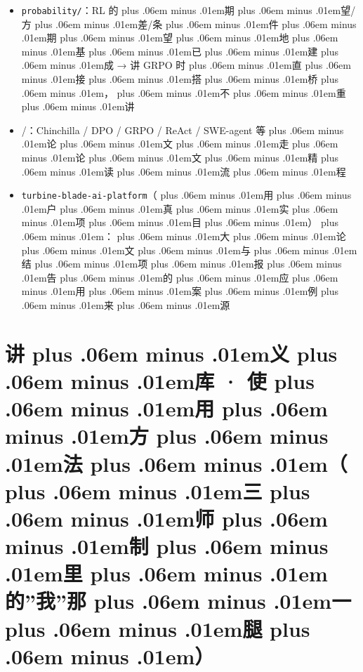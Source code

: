 \documentclass[
]{article}
\newcommand{\passthrough}[1]{#1}
\providecommand{\tightlist}{%
  \setlength{\itemsep}{0pt}\setlength{\parskip}{0pt}}
\def\zh#1{{\zhfont #1}}
\def\sym#1{{\symfont #1}}
\def\codezh#1{{\zhmonofont #1}}
\def\zhglue{\hskip0pt plus .06em minus .01em}
\begin{document}
\begin{itemize}
\tightlist
\item
  \passthrough{\lstinline!probability/!}\zh{：}RL \zh{的\zhglue 期\zhglue 望}/\zh{方\zhglue 差}/\zh{条\zhglue 件\zhglue 期\zhglue 望\zhglue 地\zhglue 基\zhglue 已\zhglue 建\zhglue 成} \sym{→} \zh{讲} GRPO \zh{时\zhglue 直\zhglue 接\zhglue 搭\zhglue 桥\zhglue ，\zhglue 不\zhglue 重\zhglue 讲}
\item
  \passthrough{\codezh{{\zh{论}}{\zh{文}}{\zh{精}}{\zh{读}}/}}\zh{：}Chinchilla / DPO / GRPO / ReAct / SWE-agent \zh{等\zhglue 论\zhglue 文\zhglue 走\zhglue 论\zhglue 文\zhglue 精\zhglue 读\zhglue 流\zhglue 程}
\item
  \passthrough{\lstinline!turbine-blade-ai-platform!}\zh{（\zhglue 用\zhglue 户\zhglue 真\zhglue 实\zhglue 项\zhglue 目\zhglue ）\zhglue ：\zhglue 大\zhglue 论\zhglue 文\zhglue 与\zhglue 结\zhglue 项\zhglue 报\zhglue 告\zhglue 的\zhglue 应\zhglue 用\zhglue 案\zhglue 例\zhglue 来\zhglue 源}
\end{itemize}

\newpage

\section{\zh{讲\zhglue 义\zhglue 库} \sym{·} \zh{使\zhglue 用\zhglue 方\zhglue 法\zhglue （\zhglue 三\zhglue 师\zhglue 制\zhglue 里\zhglue 的}''\zh{我}''\zh{那\zhglue 一\zhglue 腿\zhglue ）}}\label{ux8bb2ux4e49ux5e93-ux4f7fux7528ux65b9ux6cd5ux4e09ux5e08ux5236ux91ccux7684ux6211ux90a3ux4e00ux817f}
\end{document}
